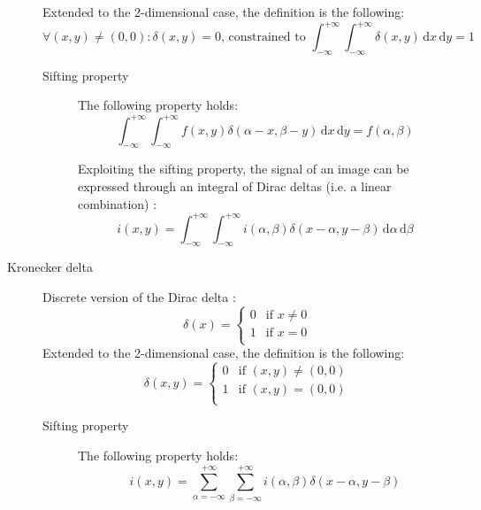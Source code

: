\begin{description}
        Extended to the 2-dimensional case, the definition is the following:
        \[ \forall (x, y) \neq (0, 0): \delta(x, y) = 0 \text{, constrained to } \int_{-\infty}^{+\infty}\int_{-\infty}^{+\infty} \delta(x, y) \,\text{d}x\,\text{d}y = 1 \]

        \begin{description}
            \item[Sifting property] 
                The following property holds:
                \[ \int_{-\infty}^{+\infty}\int_{-\infty}^{+\infty} f(x, y) \delta(\alpha-x, \beta-y) \,\text{d}x\,\text{d}y = f(\alpha, \beta) \]
                
                \begin{remark}
                    Exploiting the sifting property, the signal of an image can be expressed through an integral of Dirac deltas 
                    (i.e. a linear combination) \cite{slides:filters,book:sonka}:
                    \[ i(x, y) = \int_{-\infty}^{+\infty}\int_{-\infty}^{+\infty} i(\alpha, \beta) \delta(x-\alpha, y-\beta) \,\text{d}\alpha\,\text{d}\beta \]
                \end{remark}
        \end{description}

    \item[Kronecker delta] 
        Discrete version of the Dirac delta \cite{wiki:kronecker}:
        \[ \delta(x) = \begin{cases}
            0 & \text{if $x \neq 0$} \\
            1 & \text{if $x = 0$} \\
        \end{cases} \]
        Extended to the 2-dimensional case, the definition is the following:
        \[ \delta(x, y) = \begin{cases}
            0 & \text{if $(x, y) \neq (0, 0)$} \\
            1 & \text{if $(x, y) = (0, 0)$} \\
        \end{cases} \]
        \begin{description}
            \item[Sifting property] 
                The following property holds:
                \[ i(x, y) = \sum_{\alpha=-\infty}^{+\infty} \sum_{\beta=-\infty}^{+\infty} i(\alpha, \beta) \delta(x-\alpha, y-\beta) \]
        \end{description}
\end{description}


